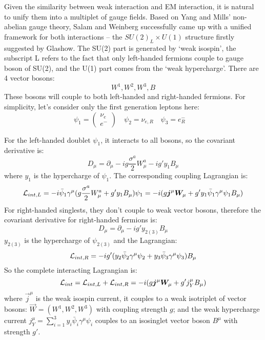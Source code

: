 Given the similarity between weak interaction and EM interaction, it is natural
to unify them into a multiplet of gauge fields. Based on Yang and Mills' non-abelian 
gauge theory, Salam and Weinberg successfully came up with a unified 
framework for both interactions -- the $SU(2)_L \times U(1)$ structure firstly suggested 
by Glashow. The SU(2) part is generated by `weak isospin', the subscript L refers
to the fact that only left-handed fermions couple to gauge boson of SU(2), and the U(1)
part comes from the `weak hypercharge'. There are 4 vector bosons:
$$ W^1, W^2, W^3, B $$
These bosons will couple to both left-handed and right-handed fermions. For simplicity,
let's consider only the first generation leptons here:
\begin{equation}
    \psi_1 = \begin{pmatrix} \nu_e \\ e^-  \end{pmatrix}	\quad
    \psi_2 = \nu_{e,R}	\quad
    \psi_3 = e^-_R    \quad
\end{equation}

For the left-handed doublet $\psi_1$, it interacts to all bosons, 
so the covariant derivative is:
\begin{equation}
    D_\mu = \partial_\mu - ig\frac{\sigma^a}{2}W_\mu^a - ig'y_1B_\mu
\end{equation}
where $y_1$ is the hypercharge of $\psi_1$.
The corresponding coupling Lagrangian is:
\begin{equation}
    \mathcal{L}_{int, L} = -i\bar{\psi}_1 \gamma^\mu (g\frac{\sigma^a}{2}W^a_\mu + g'y_1B_\mu) \psi_1
	= -i(g\boldsymbol{j}^\mu\boldsymbol{W}_\mu + g'y_1\bar{\psi}_1\gamma^\mu\psi_1 B_\mu)
\end{equation}
For right-handed singlests, they don't couple to weak vector bosons, 
therefore the covariant derivative for right-handed fermions is:
\begin{equation}
    D_\mu = \partial_\mu - ig'y_{2(3)}B_\mu
\end{equation}
$y_{2(3)}$ is the hypercharge of $\psi_{2(3)}$
and the Lagrangian:
\begin{equation}
    \mathcal{L}_{int, R} = -ig'(y_2\bar{\psi}_2 \gamma^\mu \psi_2 + y_3\bar{\psi}_3\gamma^\mu \psi_3) B_\mu
\end{equation}
So the complete interacting Lagrangian is:
\begin{equation}
    \mathcal{L}_{int} = \mathcal{L}_{int, L} + \mathcal{L}_{int, R} = -i(g\boldsymbol{j}^\mu \boldsymbol{W}_\mu + g'j^\mu_{Y} B_\mu)
    \label{eq:GSW}
\end{equation}
where $\vec{j}^\mu$ is the weak isospin current, it couples to a weak 
isotriplet of vector bosons: $\vec{W} = (W^1, W^2, W^3)$ with
coupling strength $g$; and the weak hypercharge current 
$j^\mu_{Y} = \sum_{i=1}^3 y_i\bar{\psi}_i\gamma^\mu\psi_i$ couples to 
an isosinglet vector boson $B^\mu$ with strength $g'$. 

